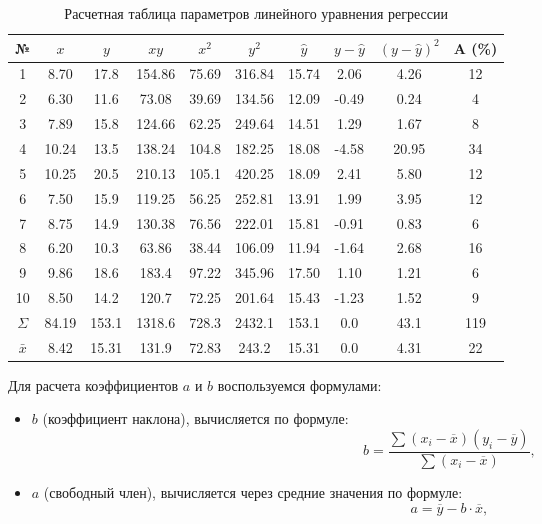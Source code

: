 \begin{table}[H]
    \centering
    \caption{Расчетная таблица параметров линейного уравнения регрессии}
    \begin{tabular}{|c|c|c|c|c|c|c|c|c|c|}
        \hline
        № & $x$ & $y$ & $xy$ & $x^2$ & $y^2$ & $\hat{y}$ & $y-\hat{y}$ & $(y-\hat{y})^2$ & A (\%) \\
        \hline
        1 & 8.70 & 17.8 & 154.86 & 75.69 & 316.84 & 15.74 & 2.06 & 4.26 & 12 \\
        \hline
        2 & 6.30 & 11.6 & 73.08 & 39.69 & 134.56 & 12.09 & -0.49 & 0.24 & 4 \\
        \hline
        3 & 7.89 & 15.8 & 124.66 & 62.25 & 249.64 & 14.51 & 1.29 & 1.67 & 8 \\
        \hline
        4 & 10.24 & 13.5 & 138.24 & 104.8 & 182.25 & 18.08 & -4.58 & 20.95 & 34 \\
        \hline
        5 & 10.25 & 20.5 & 210.13 & 105.1 & 420.25 & 18.09 & 2.41 & 5.80 & 12 \\
        \hline
        6 & 7.50 & 15.9 & 119.25 & 56.25 & 252.81 & 13.91 & 1.99 & 3.95 & 12 \\
        \hline
        7 & 8.75 & 14.9 & 130.38 & 76.56 & 222.01 & 15.81 & -0.91 & 0.83 & 6 \\
        \hline
        8 & 6.20 & 10.3 & 63.86 & 38.44 & 106.09 & 11.94 & -1.64 & 2.68 & 16 \\
        \hline
        9 & 9.86 & 18.6 & 183.4 & 97.22 & 345.96 & 17.50 & 1.10 & 1.21 & 6 \\
        \hline
        10 & 8.50 & 14.2 & 120.7 & 72.25 & 201.64 & 15.43 & -1.23 & 1.52 & 9 \\
        \hline
        $\Sigma$ & 84.19 & 153.1 & 1318.6 & 728.3 & 2432.1 & 153.1 & 0.0 & 43.1 & 119 \\
        \hline
        $\bar{x}$ & 8.42 & 15.31 & 131.9 & 72.83 & 243.2 & 15.31 & 0.0 & 4.31 & 22 \\
        \hline
    \end{tabular}
    \label{tab:tabl4}
\end{table}

Для расчета коэффициентов $a$ и $b$ воспользуемся формулами:
\begin{itemize}[label=---]
    \item $b$ (коэффициент наклона), вычисляется по формуле:
        \begin{equation}
            b = \frac{\sum (x_i - \overline{x})(y_i - \overline{y})}{\sum (x_i - \overline{x})},
        \end{equation}
    \item $a$ (свободный член), вычисляется через средние значения по формуле:
        \begin{equation}
            a = \overline{y} - b \cdot \overline{x},
        \end{equation}
\end{itemize}

